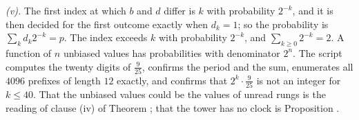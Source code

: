 \emph{(v).} The first index at which $b$ and $d$ differ is $k$ with probability $2^{-k}$, and it is then decided for the first outcome exactly when $d_{k} = 1$; so the probability is $\sum_{k}d_{k}2^{-k} = p$. The index exceeds $k$ with probability $2^{-k}$, and $\sum_{k \ge 0}2^{-k} = 2$. A function of $n$ unbiased values has probabilities with denominator $2^{n}$. The script computes the twenty digits of $\tfrac{9}{25}$, confirms the period and the sum, enumerates all $4096$ prefixes of length $12$ exactly, and confirms that $2^{k}\cdot\tfrac{9}{25}$ is not an integer for $k \le 40$. That the unbiased values could be the values of unread rungs is the reading of clause (iv) of Theorem ; that the tower has no clock is Proposition .
